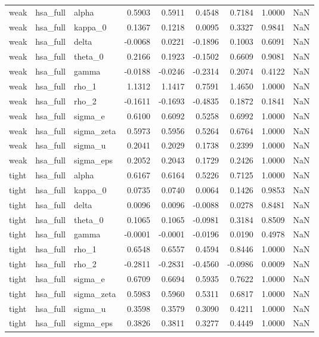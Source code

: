 \begin{tabular}{lllrrrrrl}
weak & hsa\_full & alpha & 0.5903 & 0.5911 & 0.4548 & 0.7184 & 1.0000 & NaN \\
weak & hsa\_full & kappa\_0 & 0.1367 & 0.1218 & 0.0095 & 0.3327 & 0.9841 & NaN \\
weak & hsa\_full & delta & -0.0068 & 0.0221 & -0.1896 & 0.1003 & 0.6091 & NaN \\
weak & hsa\_full & theta\_0 & 0.2166 & 0.1923 & -0.1502 & 0.6609 & 0.9081 & NaN \\
weak & hsa\_full & gamma & -0.0188 & -0.0246 & -0.2314 & 0.2074 & 0.4122 & NaN \\
weak & hsa\_full & rho\_1 & 1.1312 & 1.1417 & 0.7591 & 1.4650 & 1.0000 & NaN \\
weak & hsa\_full & rho\_2 & -0.1611 & -0.1693 & -0.4835 & 0.1872 & 0.1841 & NaN \\
weak & hsa\_full & sigma\_e & 0.6100 & 0.6092 & 0.5258 & 0.6992 & 1.0000 & NaN \\
weak & hsa\_full & sigma\_zeta & 0.5973 & 0.5956 & 0.5264 & 0.6764 & 1.0000 & NaN \\
weak & hsa\_full & sigma\_u & 0.2041 & 0.2029 & 0.1738 & 0.2399 & 1.0000 & NaN \\
weak & hsa\_full & sigma\_eps & 0.2052 & 0.2043 & 0.1729 & 0.2426 & 1.0000 & NaN \\
tight & hsa\_full & alpha & 0.6167 & 0.6164 & 0.5226 & 0.7125 & 1.0000 & NaN \\
tight & hsa\_full & kappa\_0 & 0.0735 & 0.0740 & 0.0064 & 0.1426 & 0.9853 & NaN \\
tight & hsa\_full & delta & 0.0096 & 0.0096 & -0.0088 & 0.0278 & 0.8481 & NaN \\
tight & hsa\_full & theta\_0 & 0.1065 & 0.1065 & -0.0981 & 0.3184 & 0.8509 & NaN \\
tight & hsa\_full & gamma & -0.0001 & -0.0001 & -0.0196 & 0.0190 & 0.4978 & NaN \\
tight & hsa\_full & rho\_1 & 0.6548 & 0.6557 & 0.4594 & 0.8446 & 1.0000 & NaN \\
tight & hsa\_full & rho\_2 & -0.2811 & -0.2831 & -0.4560 & -0.0986 & 0.0009 & NaN \\
tight & hsa\_full & sigma\_e & 0.6709 & 0.6694 & 0.5935 & 0.7622 & 1.0000 & NaN \\
tight & hsa\_full & sigma\_zeta & 0.5983 & 0.5960 & 0.5311 & 0.6817 & 1.0000 & NaN \\
tight & hsa\_full & sigma\_u & 0.3598 & 0.3579 & 0.3090 & 0.4211 & 1.0000 & NaN \\
tight & hsa\_full & sigma\_eps & 0.3826 & 0.3811 & 0.3277 & 0.4449 & 1.0000 & NaN \\
\bottomrule
\end{tabular}

